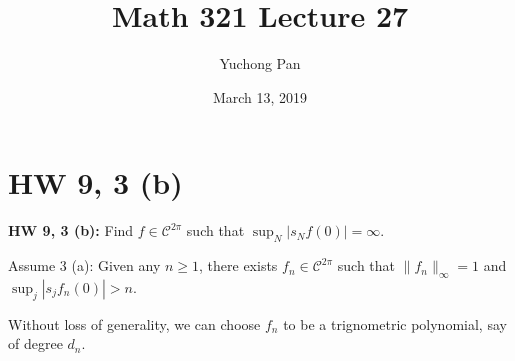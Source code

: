 \documentclass[letterpaper, reqno,11pt]{article}
\begin{document}
\title{Math 321 Lecture 27}
\author{Yuchong Pan}
\date{March 13, 2019}
\newtheorem{thm}{Theorem}
\newtheorem{defn}{Definition}
\newtheorem*{remark}{Remark}
\newtheorem{claim}{Claim}
\newtheorem{cor}{Corollary}
\newtheorem{lemma}{Lemma}
\newtheorem{prop}{Proposition}
\newtheorem{fact}{Fact}
\maketitle
%

\section{HW 9, 3 (b)}

{\bf HW 9, 3 (b):} Find $f \in \mathcal C^{2\pi}$ such that $\sup_N |s_N f(0)| = \infty$.

\medskip

\noindent Assume 3 (a): Given any $n \geq 1$, there exists $f_n \in \mathcal C^{2\pi}$ such that $\lVert f_n \rVert_\infty = 1$ and $\sup_j |s_j f_n(0)| > n$.

\medskip

 Without loss of generality, we can choose $f_n$ to be a trignometric polynomial, say of degree $d_n$.
\end{document}
